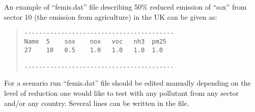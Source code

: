 An example of ``femis.dat'' file describing 50\% reduced emission of
``sox'' from sector 10 (the emission from agriculture) in the UK can be given as:  
\begin{quote}
\begin{verbatim}
-----------------------------------------
Name  5    sox    nox   voc   nh3  pm25 
27    10   0.5    1.0   1.0   1.0  1.0   

-----------------------------------------
\end{verbatim}        
\end{quote}
For a scenario run ``femis.dat'' file should be edited 
manually depending on the level of
reduction one would like to test with any pollutant from any sector
and/or any country. Several lines can be written in the file.



